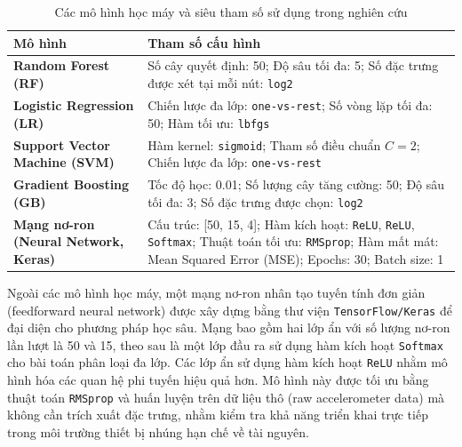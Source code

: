 \begin{table}[htbp]
\caption{Các mô hình học máy và siêu tham số sử dụng trong nghiên cứu}
\label{tab:models}
\centering
\renewcommand{\arraystretch}{1.2}
\begin{tabular}{|l|p{9cm}|}
\hline
\textbf{Mô hình} & \textbf{Tham số cấu hình} \\
\hline
\textbf{Random Forest (RF)} & 
Số cây quyết định: 50; \newline
Độ sâu tối đa: 5; \newline
Số đặc trưng được xét tại mỗi nút: \texttt{log2} \\
\hline
\textbf{Logistic Regression (LR)} & 
Chiến lược đa lớp: \texttt{one-vs-rest}; \newline
Số vòng lặp tối đa: 50; \newline
Hàm tối ưu: \texttt{lbfgs} \\
\hline
\textbf{Support Vector Machine (SVM)} & 
Hàm kernel: \texttt{sigmoid}; \newline
Tham số điều chuẩn $C = 2$; \newline
Chiến lược đa lớp: \texttt{one-vs-rest} \\
\hline
\textbf{Gradient Boosting (GB)} & 
Tốc độ học: 0.01; \newline
Số lượng cây tăng cường: 50; \newline
Độ sâu tối đa: 3; \newline
Số đặc trưng được chọn: \texttt{log2} \\
\hline
\textbf{Mạng nơ-ron (Neural Network, Keras)} & 
Cấu trúc: [50, 15, 4]; \newline
Hàm kích hoạt: \texttt{ReLU}, \texttt{ReLU}, \texttt{Softmax}; \newline
Thuật toán tối ưu: \texttt{RMSprop}; \newline
Hàm mất mát: Mean Squared Error (MSE); \newline
Epochs: 30; Batch size: 1 \\
\hline
\end{tabular}
\end{table}

Ngoài các mô hình học máy, một mạng nơ-ron nhân tạo tuyến tính đơn giản (feedforward neural network) được xây dựng bằng thư viện \texttt{TensorFlow/Keras} để đại diện cho phương pháp học sâu. Mạng bao gồm hai lớp ẩn với số lượng nơ-ron lần lượt là 50 và 15, theo sau là một lớp đầu ra sử dụng hàm kích hoạt \texttt{Softmax} cho bài toán phân loại đa lớp. Các lớp ẩn sử dụng hàm kích hoạt \texttt{ReLU} nhằm mô hình hóa các quan hệ phi tuyến hiệu quả hơn. Mô hình này được tối ưu bằng thuật toán \texttt{RMSprop} và huấn luyện trên dữ liệu thô (raw accelerometer data) mà không cần trích xuất đặc trưng, nhằm kiểm tra khả năng triển khai trực tiếp trong môi trường thiết bị nhúng hạn chế về tài nguyên.


